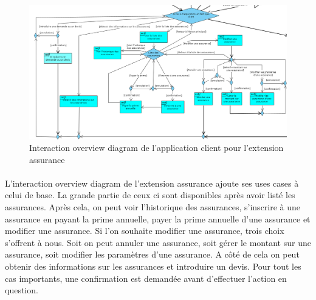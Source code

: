 \documentclass[]{article}
\begin{document}
    \begin{figure}[ht]
        \centering
        \includegraphics[scale=0.22]{img/InteractionDiagramClient.png}
        \caption{Interaction overview diagram de l'application client pour l'extension assurance}
        \label{fig1}
        \end{figure}

    \paragraph{}L’interaction overview diagram de l’extension assurance ajoute ses uses cases à celui de base. La grande partie de ceux ci sont disponibles après avoir listé les assurances. Après cela, on peut voir l’historique des assurances, s’inscrire à une assurance en payant la prime annuelle, payer la prime annuelle d’une assurance et modifier une assurance. Si l’on souhaite modifier une assurance, trois choix s’offrent à nous. Soit on peut annuler une assurance, soit gérer le montant sur une assurance, soit modifier les paramètres d’une assurance. A côté de cela on peut obtenir des informations sur les assurances et introduire un devis. Pour tout les cas importants, une confirmation est demandée avant d’effectuer l’action en question.
\end{document}
